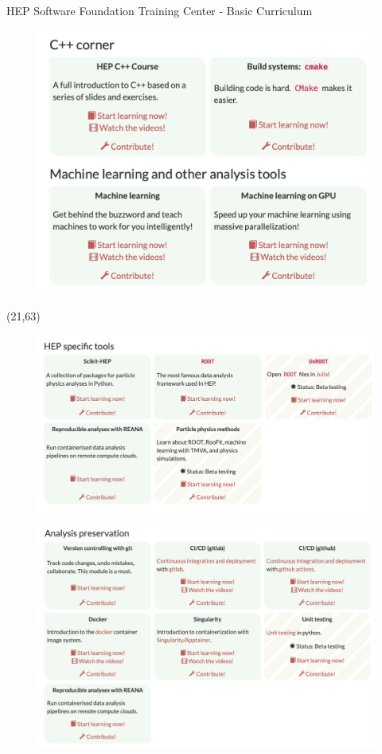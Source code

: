 \documentclass[final]{beamer}
\begin{document}
\begin{frame}{}
\begin{textblock}{38.0}
\begin{block}{HEP Software Foundation Training Center - Basic Curriculum}
\begin{textblock}{19.0}
\begin{figure}[tbph]
\includegraphics[width=1.00\textwidth]{images/hsf-training-3.png}
\end{figure}
\end{textblock}
\begin{textblock}{19.0}(21,63)
\begin{figure}[tbph]
\centering
\includegraphics[width=1.00\textwidth]{images/hsf-training-4.png}
\end{figure}
\begin{figure}[tbph]
\centering
\includegraphics[width=1.00\textwidth]{images/hsf-training-5.png}

\end{figure}
\end{textblock}
\end{block}
\end{textblock}
\end{frame}
\end{document}
